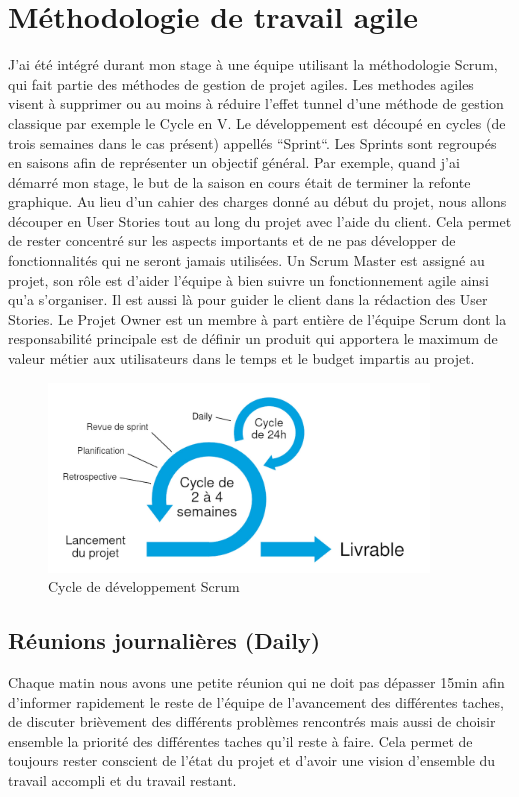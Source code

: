 \documentclass[12pt, a4paper]{report}
\begin{document}
\chapter{Méthodologie de travail agile}
J'ai été intégré durant mon stage à une équipe utilisant la méthodologie Scrum, qui fait partie des méthodes de gestion de projet agiles. Les methodes agiles visent à supprimer ou au moins à réduire l'effet tunnel d'une méthode de gestion classique par exemple le Cycle en V.\newline
Le développement est découpé en cycles (de trois semaines dans le cas présent) appellés ``Sprint``.\newline
Les Sprints sont regroupés en saisons afin de représenter un objectif général.
Par exemple, quand j'ai démarré mon stage, le but de la saison en cours était de terminer la refonte graphique.
Au lieu d'un cahier des charges donné au début du projet, nous allons découper en User Stories tout au long du projet avec l'aide du client.\newline
Cela permet de rester concentré sur les aspects importants et de ne pas développer de fonctionnalités qui ne seront jamais utilisées.\newline
Un Scrum Master est assigné au projet, son rôle est d'aider l'équipe à bien suivre un fonctionnement agile ainsi qu'a s'organiser. Il est aussi là pour guider le client dans la rédaction des User Stories.
Le Projet Owner est un membre à part entière de l’équipe Scrum dont la responsabilité principale est de définir un produit qui apportera le maximum de valeur métier aux utilisateurs dans le temps et le budget impartis au projet.
\begin{figure}[H]
    \begin{center}
        \includegraphics[width=0.9\textwidth]{scrum.jpg}
    \end{center}
    \caption{Cycle de développement Scrum}
\end{figure}
\section{Réunions journalières (Daily)}
Chaque matin nous avons une petite réunion qui ne doit pas dépasser 15min afin d'informer rapidement le reste de l'équipe de l'avancement des différentes taches, de discuter brièvement des différents problèmes rencontrés mais aussi de choisir ensemble la priorité des différentes taches qu'il reste à faire.\newline
Cela permet de toujours rester conscient de l'état du projet et d'avoir une vision d'ensemble du travail accompli et du travail restant.
\end{document}
